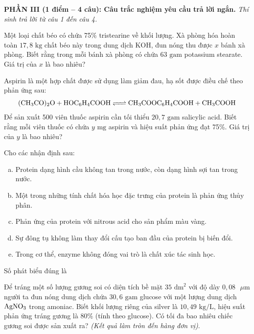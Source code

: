 \documentclass[12pt,a4paper]{article}
\begin{document}
\vspace{0.3cm}
\noindent
\textbf{PHẦN III (1 điểm -- 4 câu): Câu trắc nghiệm yêu cầu trả lời ngắn.} \textit{Thí sinh trả lời từ câu 1 đến câu 4.}

\setcounter{ex}{0}

\begin{ex}
Một loại chất béo có chứa 75\% tristearine về khối lượng. Xà phòng hóa hoàn toàn $17{,}8\text{ kg}$ chất béo này trong dung dịch $\text{KOH}$, đun nóng thu được $x$ bánh xà phòng. Biết rằng trong mỗi bánh xà phòng có chứa $63\text{ gam}$ potassium stearate. Giá trị của $x$ là bao nhiêu?
\loigiai{}
\end{ex}

\begin{ex}
Aspirin là một hợp chất được sử dụng làm giảm đau, hạ sốt được điều chế theo phản ứng sau:
\[\ce{(CH3CO)2O + HOC6H4COOH <=> CH3COOC6H4COOH + CH3COOH}\]
Để sản xuất 500 viên thuốc aspirin cần tối thiểu $20{,}7\text{ gam}$ salicylic acid. Biết rằng mỗi viên thuốc có chứa $y\text{ mg}$ aspirin và hiệu suất phản ứng đạt 75\%. Giá trị của $y$ là bao nhiêu?
\loigiai{}
\end{ex}

\begin{ex}
Cho các nhận định sau:
\begin{enumerate}[(a)]
	\item Protein dạng hình cầu không tan trong nước, còn dạng hình sợi tan trong nước.
	\item Một trong những tính chất hóa học đặc trưng của protein là phản ứng thủy phân.
	\item Phản ứng của protein với nitrous acid cho sản phẩm màu vàng.
	\item Sự đông tụ không làm thay đổi cấu tạo ban đầu của protein bị biến đổi.
	\item Trong cơ thể, enzyme không đóng vai trò là chất xúc tác sinh học.
\end{enumerate}
Số phát biểu đúng là
\loigiai{}
\end{ex}

\begin{ex}
Để tráng một số lượng gương soi có diện tích bề mặt $35\text{ dm}^2$ với độ dày $0{,}08\text{ }\mu\text{m}$ người ta đun nóng dung dịch chứa $30{,}6\text{ gam}$ glucose với một lượng dung dịch $\ce{AgNO3}$ trong amoniac. Biết khối lượng riêng của silver là $10{,}49\text{ kg/L}$, hiệu suất phản ứng tráng gương là 80\% (tính theo glucose). Có tối đa bao nhiêu chiếc gương soi được sản xuất ra? \textit{(Kết quả làm tròn đến hàng đơn vị)}.
\loigiai{}
\end{ex}
\end{document}
